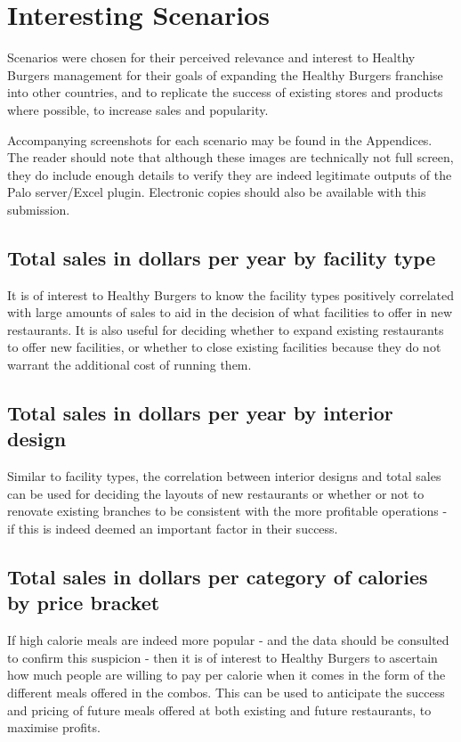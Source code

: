 \documentclass[11pt, a4paper]{article}
\begin{document}
\section*{Interesting Scenarios}

Scenarios were chosen for their perceived relevance and interest to Healthy Burgers management for their goals of expanding the Healthy Burgers franchise into other countries, and to replicate the success of existing stores and products where possible, to increase sales and popularity.

Accompanying screenshots for each scenario may be found in the Appendices. The reader should note that although these images are technically not full screen, they do include enough details to verify they are indeed legitimate outputs of the Palo server/Excel plugin. Electronic copies should also be available with this submission.

\subsection*{Total sales in dollars per year by facility type}

It is of interest to Healthy Burgers to know the facility types positively correlated with large amounts of sales to aid in the decision of what facilities to offer in new restaurants. It is also useful for deciding whether to expand existing restaurants to offer new facilities, or whether to close existing facilities because they do not warrant the additional cost of running them.

\subsection*{Total sales in dollars per year by interior design}

Similar to facility types, the correlation between interior designs and total sales can be used for deciding the layouts of new restaurants or whether or not to renovate existing branches to be consistent with the more profitable operations - if this is indeed deemed an important factor in their success.

\subsection*{Total sales in dollars per category of calories by price bracket}

If high calorie meals are indeed more popular - and the data should be consulted to confirm this suspicion - then it is of interest to Healthy Burgers to ascertain how much people are willing to pay per calorie when it comes in the form of the different meals offered in the combos. This can be used to anticipate the success and pricing of future meals offered at both existing and future restaurants, to maximise profits.
\end{document}
